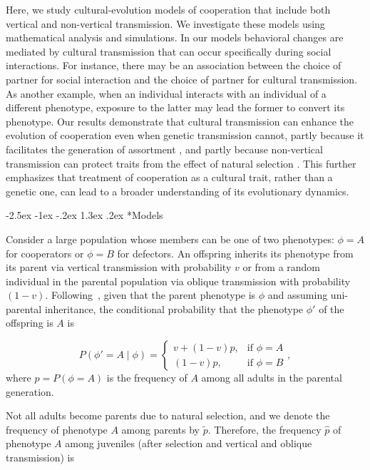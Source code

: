 \documentclass[12pt]{extarticle}
\makeatletter
\renewcommand\section{\@startsection {section}{1}{\z@}%
     {-2.5ex \@plus -1ex \@minus -.2ex}%
     {1.3ex \@plus.2ex}%
    {\Large\bfseries}}
\makeatother
\begin{document}
Here, we study cultural-evolution models of cooperation that include both vertical and non-vertical transmission. 
We investigate these models using mathematical analysis and simulations.  
In our models behavioral changes are mediated by cultural transmission that can occur specifically during social interactions.
For instance, there may be an association between the choice of partner for social interaction and the choice of partner for cultural transmission.
As another example, when an individual interacts with an individual of a different phenotype,  exposure to the latter may lead the former to  convert its phenotype.
Our results demonstrate that cultural transmission can enhance the evolution of cooperation even when genetic transmission cannot, partly because it facilitates the generation of assortment \citep{Fletcher2009assortment}, and partly because non-vertical transmission can protect traits from the effect of natural selection \citep{ram2018evolution}.
This further emphasizes that treatment of cooperation as a cultural trait, rather than a genetic one, can lead to a broader understanding of its evolutionary dynamics.


\section*{Models}

Consider a large population whose members can be one of two phenotypes: $\phi=A$ for cooperators or $\phi=B$ for defectors.
An offspring inherits its phenotype from its parent via vertical transmission with probability $v$ or from a random individual in the parental population via oblique transmission with probability $(1-v)$. 
Following~\citet{ram2018evolution}, given that the parent phenotype is $\phi$ and assuming uni-parental inheritance, %
the conditional probability that the phenotype $\phi'$ of the offspring is $A$ is 

\begin{equation} \label{eq:vertical_oblique_transmission}
P(\phi'=A \mid \phi) = \begin{cases}
v + (1-v)p, & \text{if } \phi=A \\
(1-v)p, & \text{if } \phi=B
\end{cases},
\end{equation}
where $p=P(\phi=A)$ is the frequency of $A$ among all adults in the parental generation.  

Not all adults become parents due to natural selection, and we denote the frequency of phenotype $A$ among parents by $\tilde{p}$.
Therefore, the frequency $\hat{p}$ of  phenotype $A$ among juveniles (after selection and vertical and oblique transmission) is
\end{document}
